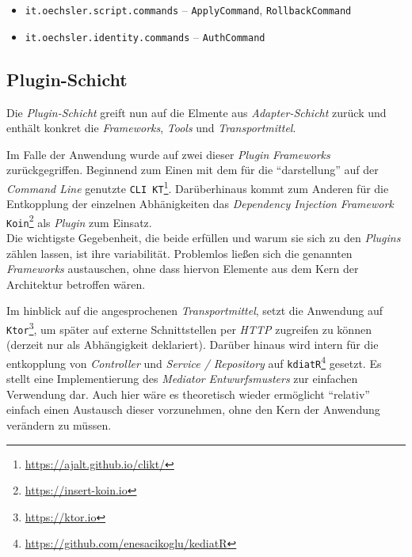 \begin{itemize}
    \item \texttt{it.oechsler.script.commands} -- \texttt{ApplyCommand}, \texttt{RollbackCommand}
    \item \texttt{it.oechsler.identity.commands} -- \texttt{AuthCommand}
\end{itemize}

\subsection{Plugin-Schicht}
\label{subsec:plugin_schicht}

Die \emph{Plugin-Schicht} greift nun auf die Elmente aus \emph{Adapter-Schicht} zurück und enthält konkret die \emph{Frameworks}, \emph{Tools} und \emph{Transportmittel}.

Im Falle der Anwendung wurde auf zwei dieser \emph{Plugin} \emph{Frameworks} zurückgegriffen. 
Beginnend zum Einen mit dem für die \enquote{darstellung} auf der \emph{Command Line} genutzte \texttt{CLI~KT}\footnote{\url{https://ajalt.github.io/clikt/}}.
Darüberhinaus kommt zum Anderen für die Entkopplung der einzelnen Abhänigkeiten das \emph{Dependency Injection} \emph{Framework} \texttt{Koin}\footnote{\url{https://insert-koin.io}} als \emph{Plugin} zum Einsatz.\\
Die wichtigste Gegebenheit, die beide erfüllen und warum sie sich zu den \emph{Plugins} zählen lassen, ist ihre variabilität.
Problemlos ließen sich die genannten \emph{Frameworks} austauschen, ohne dass hiervon Elemente aus dem Kern der Architektur betroffen wären.

Im hinblick auf die angesprochenen \emph{Transportmittel}, setzt die Anwendung auf \texttt{Ktor}\footnote{\url{https://ktor.io}}, um später auf externe Schnittstellen per \emph{HTTP} zugreifen zu können (derzeit nur als Abhängigkeit deklariert).
Darüber hinaus wird intern für die entkopplung von \emph{Controller} und \emph{Service / Repository} auf \texttt{kdiatR}\footnote{\url{https://github.com/enesacikoglu/kediatR}} gesetzt.
Es stellt eine Implementierung des \emph{Mediator} \emph{Entwurfsmusters} zur einfachen Verwendung dar.
Auch hier wäre es theoretisch wieder ermöglicht \enquote{relativ} einfach einen Austausch dieser vorzunehmen, ohne den Kern der Anwendung verändern zu müssen.

